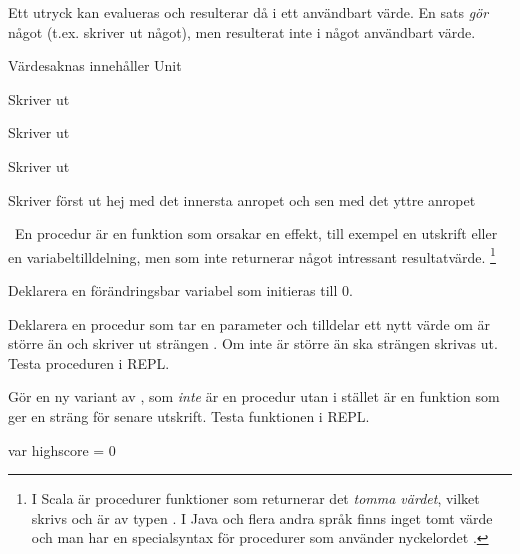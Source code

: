 \TaskSolved \what

\SubtaskSolved  Ett utryck kan evalueras och resulterar då i ett användbart värde. En sats \emph{gör} något (t.ex. skriver ut något), men resulterat inte i något användbart värde.

\SubtaskSolved {}

\SubtaskSolved

 Värdesaknas innehåller Unit

 Skriver ut 

 Skriver ut 

 Skriver ut 

 Skriver först ut hej med det innersta anropet och sen \code{()} med det yttre anropet

\SubtaskSolved  {}

\SubtaskSolved  {}

\QUESTEND




\QUESTBEGIN

\Task \what~En procedur är en funktion som orsakar en effekt, till exempel en utskrift eller en variabeltilldelning, men som inte returnerar något intressant resultatvärde.%
\footnote{I Scala är procedurer funktioner som returnerar det \emph{tomma värdet}, vilket skrivs \code{()} och är av typen . I Java och flera andra språk finns inget tomt värde och man har en specialsyntax för procedurer som använder nyckelordet . }

\Subtask Deklarera en förändringsbar variabel  som initieras till 0.

\Subtask Deklarera en procedur  som tar en parameter  och tilldelar  ett nytt värde om  är större än  och skriver ut strängen . Om inte  är större än  ska strängen  skrivas ut. Testa proceduren i REPL.

\Subtask Gör en ny variant av , som \emph{inte} är en procedur utan i stället är en funktion som ger en sträng för senare utskrift. Testa funktionen i REPL.

\SOLUTION

\TaskSolved \what

\SubtaskSolved
\begin{Code}
var highscore = 0
\end{Code}

